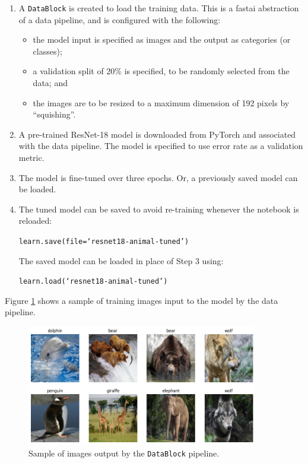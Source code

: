 \begin{enumerate}
  \item A \texttt{DataBlock} is created to load the training data. This is a fastai abstraction of a data pipeline, and is configured with the following:
  \begin{itemize}
    \item the model input is specified as images and the output as categories (or classes);
    \item a validation split of 20\% is specified, to be randomly selected from the data; and
    \item the images are to be resized to a maximum dimension of 192 pixels by ``squishing''.
  \end{itemize}

  \item A pre-trained ResNet-18 model is downloaded from PyTorch and associated with the data pipeline. The model is specified to use error rate as a validation metric.

  \item The model is fine-tuned over three epochs. Or, a previously saved model can be loaded.

  \item The tuned model can be saved to avoid re-training whenever the notebook is reloaded:
  \begin{center}
    \texttt{learn.save(file=`resnet18-animal-tuned')}
  \end{center}
  The saved model can be loaded in place of Step 3 using:
  \begin{center}
    \texttt{learn.load(`resnet18-animal-tuned')}
  \end{center}

\end{enumerate}
\vspace{1em}

Figure \ref{fig:dls_batch} shows a sample of training images input to the model by the data pipeline.

\begin{figure}[ht]
  \centering
  \includegraphics[width=0.9\textwidth]{images/q2_dls_batch.png}
  \caption{Sample of images output by the \texttt{DataBlock} pipeline.}
  \label{fig:dls_batch}
\end{figure}

